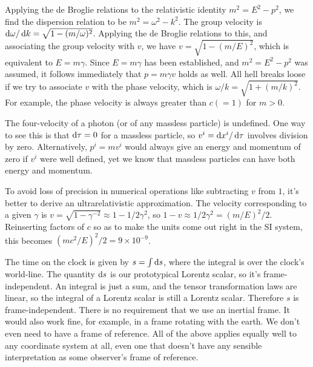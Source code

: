 Applying the de Broglie relations to the relativistic identity $m^2=E^2-p^2$, we find the
dispersion relation to be $m^2=\omega^2-k^2$. The group velocity is $\operatorname{d\!}\omega/\operatorname{d\!} k=\sqrt{1-(m/\omega)^2}$.
Applying the de Broglie relations to this, and associating the group velocity with $v$, we have
$v=\sqrt{1-(m/E)^2}$, which is equivalent to $E=m\gamma$. Since $E=m\gamma$ has been established,
and $m^2=E^2-p^2$ was assumed, it follows immediately that $p=m\gamma v$ holds as well.
All hell breaks loose if we try to associate $v$ with the phase velocity, which is
$\omega/k=\sqrt{1+(m/k)^2}$. For example, the phase velocity is always greater than $c(=1)$ for $m>0$.



The four-velocity of a photon (or of any massless particle) is undefined.
One way to see this is that $\operatorname{d\!}\tau=0$ for a massless particle, so $v^i=\operatorname{d\!} x^i/\operatorname{d\!}\tau$
involves division by zero. Alternatively, $p^i=mv^i$ would always give an energy and momentum
of zero if $v^i$ were well defined, yet we know that massless particles can have both energy and momentum.


To avoid loss of precision in numerical operations like subtracting $v$ from $1$,
it's better to derive an ultrarelativistic approximation. The velocity corresponding
to a given $\gamma$ is $v=\sqrt{1-\gamma^{-2}}\approx 1-1/2\gamma^2$, so
$1-v\approx 1/2\gamma^2=(m/E)^2/2$. Reinserting factors of $c$ so as to make the units
come out right in the SI system, this becomes $(mc^2/E)^2/2=9\times 10^{-9}$.


The time on the clock is given by $s=\int \operatorname{d\!} s$, where the integral is over the clock's
world-line. The quantity $\operatorname{d\!} s$ is our prototypical Lorentz scalar, so it's frame-independent.
An integral is just a sum, and the tensor transformation laws are linear, so the integral of
a Lorentz scalar is still a Lorentz scalar. Therefore $s$ is frame-independent. There is
no requirement that we use an inertial frame. It would also work fine, for example, in a frame
rotating with the earth. We don't even need to have a frame of reference.
All of the above applies equally well to any
coordinate system at all, even one that doesn't have any sensible interpretation as some
observer's frame of reference.

